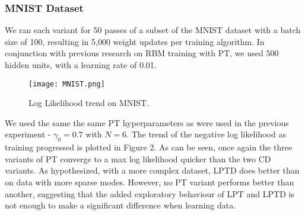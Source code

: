 \subsubsection{MNIST Dataset}
We ran each variant for 50 passes of a subset of the MNIST dataset with a batch size of 100, resulting in 5,000 weight updates per training algorithm. In conjunction with previous research on RBM training with PT, we used 500 hidden units, with a learning rate of 0.01\cite{desjardins2010tempered}. 

\begin{figure}[ht!]
	\centering
	\texttt{[image: MNIST.png]}
\caption{Log Likelihood trend on MNIST.}
\end{figure}

We used the same the same PT hyperparameters as were used in the previous experiment - $\gamma_0 = 0.7$ with $N=6$. The trend of the negative log likelihood as training progressed is plotted in Figure 2. As can be seen, once again the three variants of PT converge to a max log likelihood quicker than the two CD variants. As hypothesized, with a more complex dataset, LPTD does better than on data with more sparse modes. However, no PT variant performs better than another, suggesting that the added exploratory behaviour of LPT and LPTD is not enough to make a significant difference when learning data.  

